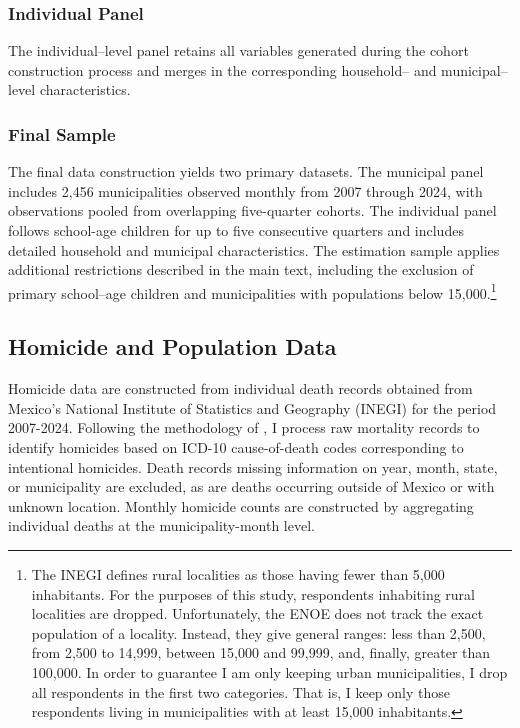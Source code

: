 \documentclass[12pt,letter,english,intoc,bibliography=totoc,index=totoc,BCOR10mm,captions=tableheading,nottitlepage,fleqn]{article}
\theoremstyle{break}
\begin{document}
\subsubsection*{Individual Panel}
The individual--level panel retains all variables generated during the cohort construction process and merges in the corresponding household-- and municipal--level characteristics.

\subsubsection*{Final Sample}
The final data construction yields two primary datasets. The municipal panel includes 2,456 municipalities observed monthly from 2007 through 2024, with observations pooled from overlapping five-quarter cohorts. The individual panel follows school-age children for up to five consecutive quarters and includes detailed household and municipal characteristics. The estimation sample applies additional restrictions described in the main text, including the exclusion of primary school--age children and municipalities with populations below 15,000.\footnote{The INEGI defines rural localities as those having fewer than 5,000 inhabitants. For the purposes of this study, respondents inhabiting rural localities are dropped. Unfortunately, the ENOE does not track the exact population of a locality. Instead, they give general ranges: less than 2,500, from 2,500 to 14,999, between 15,000 and 99,999, and, finally, greater than 100,000. In order to guarantee I am only keeping urban municipalities, I drop all respondents in the first two categories. That is, I keep only those respondents living in municipalities with at least 15,000 inhabitants.} 

\subsection{Homicide and Population Data}
Homicide data are constructed from individual death records obtained from Mexico's National Institute of Statistics and Geography (INEGI) for the period 2007-2024. Following the methodology of \citet{gargiulo2023}, I process raw mortality records to identify homicides based on ICD-10 cause-of-death codes corresponding to intentional homicides. Death records missing information on year, month, state, or municipality are excluded, as are deaths occurring outside of Mexico or with unknown location. Monthly homicide counts are constructed by aggregating individual deaths at the municipality-month level.
\end{document}
